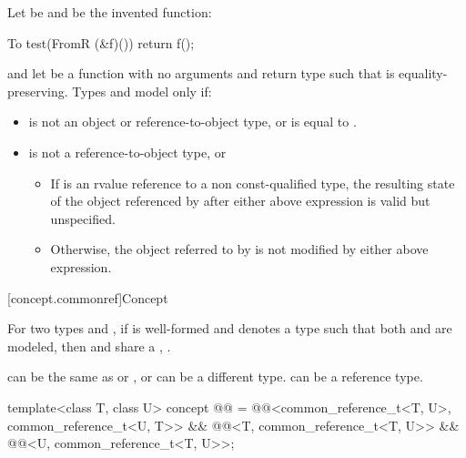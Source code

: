 \begin{itemdescr}
\pnum
Let  be  and
 be the invented function:
\begin{codeblock}
To test(FromR (&f)()) {
  return f();
}
\end{codeblock}
and let  be a function with no arguments and return type 
such that  is equality-preserving.
Types  and  model 
only if:
\begin{itemize}
\item
{} is not an object or reference-to-object type, or
 is equal to .

\item
{} is not a reference-to-object type, or
\begin{itemize}
\item
If  is an rvalue reference to a non const-qualified type, the
resulting state of the object referenced by  after either above
expression is valid but unspecified.

\item
Otherwise, the object referred to by  is not modified by either above
expression.
\end{itemize}
\end{itemize}
\end{itemdescr}


[concept.commonref]{Concept }

\pnum
For two types  and , if 
is well-formed and denotes a type  such that both
and
are modeled, then  and  share a
, .
\begin{note}
 can be the same as  or , or can be a
different type.  can be a reference type.
\end{note}

\begin{itemdecl}
template<class T, class U>
  concept @@ =
    @@<common_reference_t<T, U>, common_reference_t<U, T>> &&
    @@<T, common_reference_t<T, U>> &&
    @@<U, common_reference_t<T, U>>;
\end{itemdecl}

